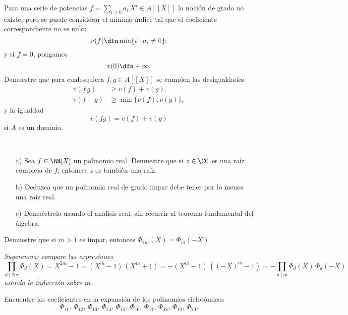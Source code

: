 \begin{ejercicio}
  Para una serie de potencias $f = \sum_{i\ge 0} a_i\,X^i \in A [\![X]\!]$ la
  noción de grado no existe, pero se puede considerar el mínimo índice tal que
  el coeficiente correspondiente no es nulo:
  $$v (f) \dfn \min \{ i \mid a_i \ne 0 \};$$
  y si $f = 0$, pongamos
  $$v (0) \dfn +\infty.$$
  Demuestre que para cualesquiera $f, g\in A [\![X]\!]$ se cumplen las
  desigualdades
  \begin{align*}
    v (f \, g) & \ge v (f) + v (g), \\
    v (f + g) & \ge \min \{ v (f), v (g) \},
  \end{align*}
  y la igualdad
  $$v (fg) = v (f) + v (g)$$
  si $A$ es un dominio.
\end{ejercicio}

\begin{ejercicio}
  ~

  \begin{enumerate}
  \item[a)] Sea $f \in \RR [X]$ un polinomio real. Demuestre que si $z\in \CC$
    es una raíz compleja de $f$, entonces $\overline{z}$ es también una raíz.

  \item[b)] Deduzca que un polinomio real de grado impar debe tener por lo menos
    una raíz real.

  \item[c)] Demuéstrelo usando el análisis real, sin recurrir al teorema
    fundamental del álgebra.
  \end{enumerate}
\end{ejercicio}

\begin{ejercicio}
  \label{ejerc:polinomios-ciclotomicos-m-y-2m}
  Demuestre que si $m > 1$ es impar, entonces $\Phi_{2m} (X) = \Phi_m (-X)$.

  \noindent \emph{Sugerencia: compare las expresiones
    $$\prod_{d\mid 2m} \Phi_d (X) = X^{2m} - 1 = (X^m - 1)\,(X^m + 1) = -(X^m - 1)\,((-X)^m - 1) = -\prod_{d\mid m} \Phi_d (X)\,\Phi_d (-X)$$
    usando la inducción sobre $m$.}
\end{ejercicio}

\begin{ejercicio}
  Encuentre los coeficientes en la expansión de los polinomios ciclotómicos
  $$\Phi_{11}, \, \Phi_{12}, \, \Phi_{13}, \, \Phi_{14}, \, \Phi_{15}, \, \Phi_{16}, \, \Phi_{17}, \, \Phi_{18}, \, \Phi_{19}, \, \Phi_{20}.$$
\end{ejercicio}

